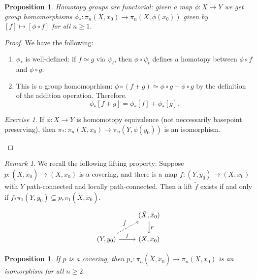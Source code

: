 \documentclass[a4paper]{tufte-book}
\newtheorem{Prop}[equation]{Proposition}
\theoremstyle{remark}
\newtheorem{Ex}[equation]{Exercise}
\newtheorem{Rem}[equation]{Remark}
\begin{document}
\begin{Prop}
	Homotopy groups are functorial: given a map $\phi \colon X \to Y$ we get group homomorphisms $\phi_{\ast} \colon \pi_n(X,x_0) \to \pi_n(X,\phi(x_0))$ given by $[f] \mapsto [\phi \circ f]$ for all $n \ge 1$. 
\end{Prop}
\begin{proof}
We have the following:
	\begin{enumerate}
	\item $\phi_*$ is well-defined: if $f \simeq g$ via $\psi_t$, then $\phi \circ \psi_t$ defines a homotopy between $\phi \circ f$ and $\phi \circ g$. 
	\item This is a group homomoprhism: $\phi \circ (f+g) \simeq \phi \circ g + \phi \circ g$ by the definition of the addition operation. Therefore. 
	\[
\phi_*[f+g] = \phi_*[f] + \phi_*[g]. 
	\]
\end{enumerate}
\begin{Ex}
	If $\phi \colon X \to Y$ is homomotopy equivalence (not neccessarily basepoint preserving), then $\pi_* \colon \pi_n(X,x_0) \to \pi_n(Y,\phi(y_0))$ is an isomorphism.  
\end{Ex}
\end{proof}
\begin{Rem}
	We recall the following lifting property: Suppose $p \colon (\tilde X,\tilde x_0) \to (X,x_0)$ is a covering, and there is a map $f \colon (Y,y_0) \to (X,x_0)$ with $Y$ path-connected and locally path-connected. Then a lift $\tilde f$ exists if and only if $f_*\pi_1(Y,y_0) \subseteq p_*\pi_1(\tilde X,\tilde x_0)$. 
\[\begin{tikzcd}
	& {(\tilde X,\tilde x_0)} \\
	{(Y,y_0)} & {(X,x_0)}
	\arrow["f", from=2-1, to=2-2]
	\arrow["p",from=1-2, to=2-2]
	\arrow["{\tilde f}", dashed, from=2-1, to=1-2]
\end{tikzcd}\]

\end{Rem}
\begin{Prop}
	If $p$ is a covering, then $p_* \colon \pi_n(\tilde X,\tilde x_0) \to \pi_n(X,x_0)$ is an isomorphism for all $ n \ge 2$. 
\end{Prop}
\end{document}
